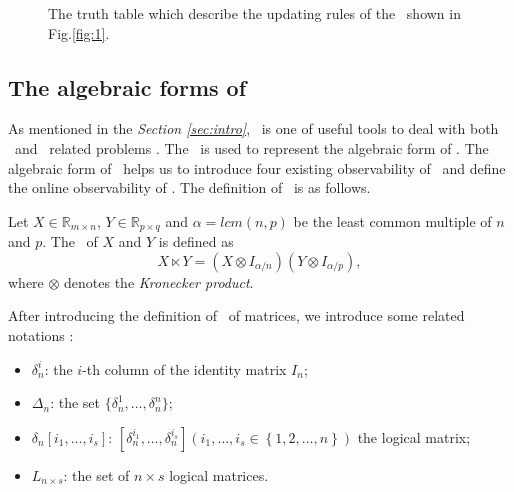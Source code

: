\begin{example}
\begin{figure}[thpb]
      \caption{The truth table which describe the updating rules of the \BCN\ shown in Fig.\ref{fig:1}.}
      \label{fig:2}
   \end{figure}
   \label{exa:2}
\end{example}   


\subsection{The algebraic forms of \BCNs}
As mentioned in the {\em Section \ref{sec:intro}}, \STP\ is one of useful tools to deal with  both \BNs\ and \BCNs\  related problems \cite{cheng2009controllability}. The \STP\ is used to represent the algebraic form of \BCN. The algebraic form of \BCN\ helps us to introduce four existing observability of \BCN\ and define the online observability of \BCN. The definition of \STP\ is as follows.

\begin{definition}[STP] 
	\cite{Cheng2011Analysis} Let $X\in\mathbb{R}_{m\times n}$, $Y\in\mathbb{R}_{p\times q}$ and $\alpha=lcm(n,p)$ be the least common multiple of $n$ and $p$. The \STP\ of $X$ and $Y$ is defined as \[X\ltimes Y=(X\otimes I_{\alpha/n})(Y\otimes I_{\alpha/p}),\] where $\otimes$ denotes the {\em Kronecker product}. 
\end{definition}

After introducing the definition of \STP\ of matrices,  we introduce some related notations \cite{Zhang2016Observability}:
\begin{itemize}
  \item $\delta^i_n$: the $i$-th column of the identity matrix $I_n$;
  \item $\Delta_n$: the set $\{\delta^1_n,\ldots,\delta^n_n \}$; 
  \item $\delta_n \left[i_1,\ldots,i_s\right]$: $\left[\delta^{i_1}_n,\ldots,\delta^{i_s}_n\right]\left(i_1,\ldots,i_s\in\left\{1,2,\ldots,n\right\}\right)$ the logical matrix;
  \item  $L_{n\times s}$: the set of $n\times s$ logical matrices.
\end{itemize}

